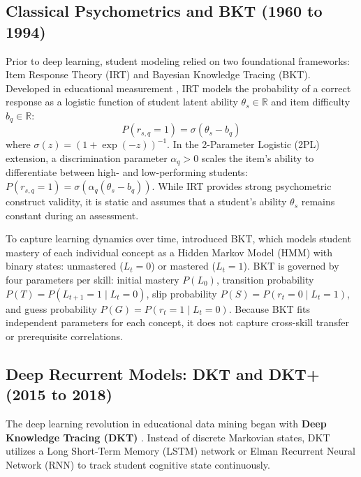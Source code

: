 \documentclass[11pt]{article}
\begin{document}
\subsection{Classical Psychometrics and BKT (1960 to 1994)}
Prior to deep learning, student modeling relied on two foundational frameworks: Item Response Theory (IRT) and Bayesian Knowledge Tracing (BKT). Developed in educational measurement \citep{rasch1960probabilistic,lord1980applications}, IRT models the probability of a correct response as a logistic function of student latent ability $\theta_s \in \mathbb{R}$ and item difficulty $b_q \in \mathbb{R}$:
\begin{equation}
P(r_{s,q} = 1) = \sigma(\theta_s - b_q)
\end{equation}
where $\sigma(z) = (1 + \exp(-z))^{-1}$. In the 2-Parameter Logistic (2PL) extension, a discrimination parameter $\alpha_q > 0$ scales the item's ability to differentiate between high- and low-performing students: $P(r_{s,q} = 1) = \sigma(\alpha_q(\theta_s - b_q))$. While IRT provides strong psychometric construct validity, it is static and assumes that a student's ability $\theta_s$ remains constant during an assessment.

To capture learning dynamics over time, \citet{corbett1994knowledge} introduced BKT, which models student mastery of each individual concept as a Hidden Markov Model (HMM) with binary states: unmastered ($L_t = 0$) or mastered ($L_t = 1$). BKT is governed by four parameters per skill: initial mastery $P(L_0)$, transition probability $P(T) = P(L_{t+1}=1 \mid L_t=0)$, slip probability $P(S) = P(r_t=0 \mid L_t=1)$, and guess probability $P(G) = P(r_t=1 \mid L_t=0)$. Because BKT fits independent parameters for each concept, it does not capture cross-skill transfer or prerequisite correlations.

\subsection{Deep Recurrent Models: DKT and DKT+ (2015 to 2018)}
The deep learning revolution in educational data mining began with \textbf{Deep Knowledge Tracing (\textsc{DKT})} \citep{piech2015deep}. Instead of discrete Markovian states, DKT utilizes a Long Short-Term Memory (LSTM) network or Elman Recurrent Neural Network (RNN) to track student cognitive state continuously.
\end{document}

